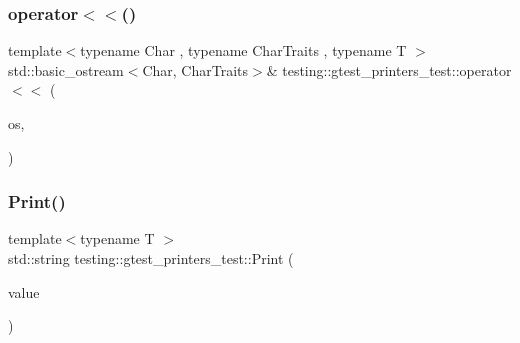 \mbox{\label{namespacetesting_1_1gtest__printers__test_a09eedfbca613302efe6438d2a537f419}} 
\subsubsection{\texorpdfstring{operator$<$$<$()}{operator<<()}\hspace{0.1cm}{\footnotesize\ttfamily [3/3]}}
{\footnotesize\ttfamily template$<$typename Char , typename Char\+Traits , typename T $>$ \\
std\+::basic\+\_\+ostream$<$Char, Char\+Traits$>$\& testing\+::gtest\+\_\+printers\+\_\+test\+::operator$<$$<$ (\begin{DoxyParamCaption}\item[{std\+::basic\+\_\+ostream$<$ Char, Char\+Traits $>$ \&}]{os,  }\item[{const \mbox{\hyperlink{classtesting_1_1gtest__printers__test_1_1AllowsGenericStreamingAndImplicitConversionTemplate}{Allows\+Generic\+Streaming\+And\+Implicit\+Conversion\+Template}}$<$ T $>$ \&}]{ }\end{DoxyParamCaption})}

\mbox{\label{namespacetesting_1_1gtest__printers__test_ab1fefdb330a473343afa3cc6d46a65f6}} 
\subsubsection{\texorpdfstring{Print()}{Print()}}
{\footnotesize\ttfamily template$<$typename T $>$ \\
std\+::string testing\+::gtest\+\_\+printers\+\_\+test\+::\+Print (\begin{DoxyParamCaption}\item[{const T \&}]{value }\end{DoxyParamCaption})}

\mbox{\label{namespacetesting_1_1gtest__printers__test_a694f23c5a8c134f0e6e24a412f8d75c1}} 

